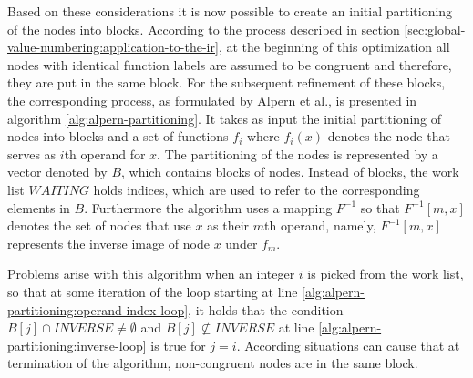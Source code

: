Based on these considerations it is now possible to create an initial partitioning of the nodes into blocks. According to the process described in section \ref{sec:global-value-numbering:application-to-the-ir}, at the beginning of this optimization all nodes with identical function labels are assumed to be congruent and therefore, they are put in the same block. For the subsequent refinement of these blocks, the corresponding process, as formulated by Alpern et al., is presented in algorithm \ref{alg:alpern-partitioning}. It takes as input the initial partitioning of nodes into blocks and a set of functions $f_i$ where $f_i(x)$ denotes the node that serves as $i$th operand for $x$. The partitioning of the nodes is represented by a vector denoted by $B$, which contains blocks of nodes. Instead of blocks, the work list $\mathit{WAITING}$ holds indices, which are used to refer to the corresponding elements in $B$. Furthermore the algorithm uses a mapping $F^{-1}$ so that $F^{-1}[m,x]$ denotes the set of nodes that use $x$ as their $m$th operand, namely, $F^{-1}[m,x]$ represents the inverse image of node $x$ under $f_m$.

Problems arise with this algorithm when an integer $i$ is picked from the work list, so that at some iteration of the loop starting at line \ref{alg:alpern-partitioning:operand-index-loop}, it holds that the condition $B[j]\cap \mathit{INVERSE} \neq \emptyset$ and $B[j] \not\subseteq \mathit{INVERSE}$ at line \ref{alg:alpern-partitioning:inverse-loop} is true for $j = i$. According situations can cause that at termination of the algorithm, non-congruent nodes are in the same block.

